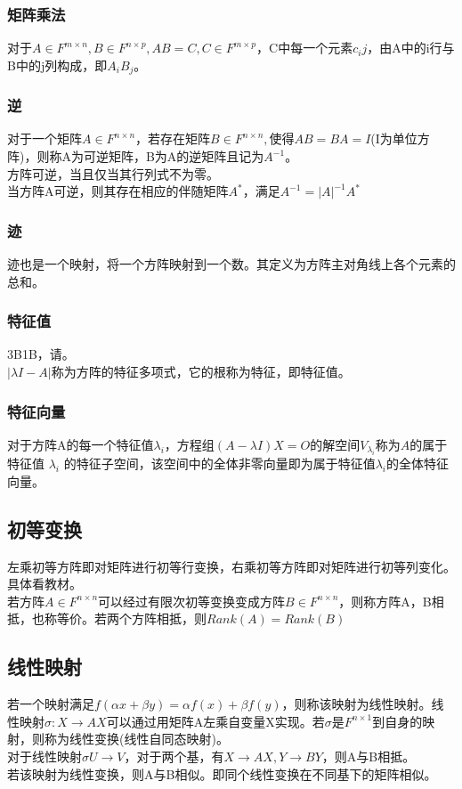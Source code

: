 \documentclass[UTF8]{ctexart}
\begin{document}
\subsubsection{矩阵乘法}
对于$A\in F^{m\times n},B\in F^{n\times p},AB=C,C\in F^{m\times p}$，C中每一个元素$c_ij$，由A中的i行与B中的j列构成，即$A_iB_j$。
\subsubsection{逆}
对于一个矩阵$A\in F^{n\times n}$，若存在矩阵$B\in F^{n\times n},$使得$AB=BA=I$(I为单位方阵)，则称A为可逆矩阵，B为A的逆矩阵且记为$A^{-1}$。\\
\indent
方阵可逆，当且仅当其行列式不为零。\\
\indent
当方阵A可逆，则其存在相应的伴随矩阵$A^{*}$，满足$A^{-1}=|A|^{-1}A^{*}$
\subsubsection{迹}
迹也是一个映射，将一个方阵映射到一个数。其定义为方阵主对角线上各个元素的总和。
\subsubsection{特征值}
3B1B，请。\\
\indent
$|\lambda I-A|$称为方阵的特征多项式，它的根称为特征，即特征值。
\subsubsection{特征向量}
对于方阵A的每一个特征值$\lambda_i$，方程组$(A-\lambda I)X=\mathit{O}$的解空间$V_{\lambda_{i}}$称为$A$的属于特征值 $\lambda_{i}$ 的特征子空间，该空间中的全体非零向量即为属于特征值$\lambda_{i}$的全体特征向量。
\subsection{初等变换}
左乘初等方阵即对矩阵进行初等行变换，右乘初等方阵即对矩阵进行初等列变化。具体看教材。\\
\indent
若方阵$A\in F^{n\times n}$可以经过有限次初等变换变成方阵$B\in F^{n\times n}$，则称方阵A，B相抵，也称等价。若两个方阵相抵，则$Rank(A)=Rank(B)$
\subsection{线性映射}
若一个映射满足$f(\alpha x+\beta y)=\alpha f(x)+\beta f(y)$，则称该映射为线性映射。线性映射$\sigma:X\rightarrow AX$可以通过用矩阵A左乘自变量X实现。若$\sigma$是$F^{n\times 1}$到自身的映射，则称为线性变换(线性自同态映射)。\\
\indent
对于线性映射$\sigma U\rightarrow V$，对于两个基，有$X\rightarrow AX,Y\rightarrow BY$，则A与B相抵。\\
\indent
若该映射为线性变换，则A与B相似。即同个线性变换在不同基下的矩阵相似。
\end{document}
